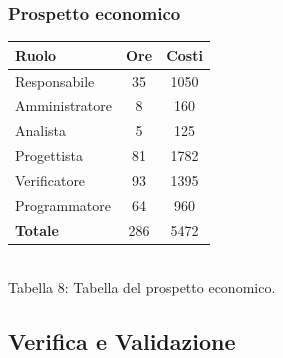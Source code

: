\subsubsection{Prospetto economico}
\begin{center}
\begin{tabular}{| l | c | c |}
\hline
Ruolo & Ore & Costi \\
\hline
Responsabile & 35 & 1050 \\
Amministratore & 8 & 160 \\
Analista & 5 & 125 \\
Progettista & 81 & 1782 \\
Verificatore & 93 & 1395 \\
Programmatore & 64 & 960 \\
\hline
\textbf{Totale} & 286 & 5472 \\
\hline
\end{tabular}
\\
Tabella 8: Tabella del prospetto economico.
\end{center}
\subsection{Verifica e Validazione}

